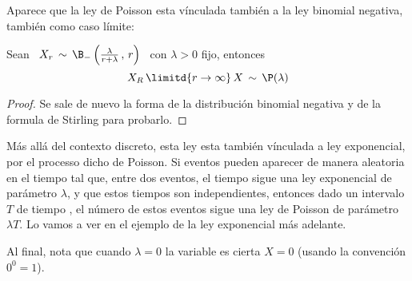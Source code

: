 Aparece  que la  ley de  Poisson esta  v\'inculada tambi\'en  a la  ley binomial
negativa, tambi\'en como caso l\'imite:
%
\begin{lema}
\label{Lem:MP:VinvuloPoissonBinomialNegativa}
%
Sean \ $X_r \, \sim \, \B_-\left( \frac{\lambda}{r+\lambda} \, , \, r \right)$ \
con $\lambda > 0$ fijo, entonces
  \[
  X_R \, \limitd{r \to \infty} \, X \, \sim \, \P(\lambda)
  \]
\end{lema}
\begin{proof}
  Se  sale de nuevo  la forma  de la  distribuci\'on binomial  negativa y  de la
  formula de Stirling para probarlo.
\end{proof}

M\'as all\'a  del contexto discreto, esta  ley esta tambi\'en  v\'inculada a ley
exponencial, por  el processo  dicho de Poisson.  Si eventos pueden  aparecer de
manera aleatoria  en el tiempo tal que,  entre dos eventos, el  tiempo sigue una
ley exponencial de par\'ametro $\lambda$,  y que estos tiempos son independientes,
entonces dado  un intervalo $T$ de tiempo  , el n\'umero de  estos eventos sigue
una ley de Poisson de par\'ametro $\lambda T$.  Lo vamos a ver en el ejemplo de la
ley exponencial m\'as adelante.

Al final, nota que cuando $\lambda = 0$ la variable es cierta $X = 0$ (usando la
convenci\'on $0^0 = 1$).
